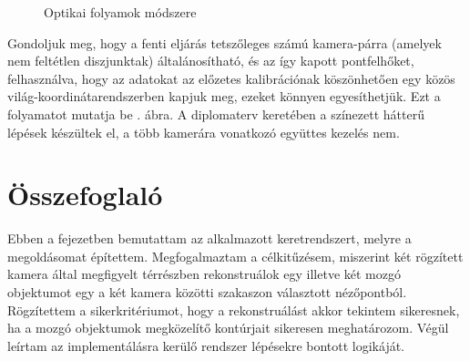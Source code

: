 \begin{sidewaysfigure}
{
}

\caption{Optikai folyamok módszere \label{fig:of-method}}
\end{sidewaysfigure}

Gondoljuk meg, hogy a fenti eljárás tetszőleges számú kamera-párra (amelyek nem feltétlen diszjunktak) általánosítható, és az így kapott pontfelhőket, felhasználva, hogy az adatokat az előzetes kalibrációnak köszönhetően egy közös világ-koordinátarendszerben kapjuk meg, ezeket könnyen egyesíthetjük. Ezt a folyamatot mutatja be . ábra. A diplomaterv keretében a színezett hátterű lépések készültek el, a több kamerára vonatkozó együttes kezelés nem.

\section{Összefoglaló}

Ebben a fejezetben bemutattam az alkalmazott keretrendszert, melyre a megoldásomat építettem. Megfogalmaztam a célkitűzésem, miszerint két rögzített kamera által megfigyelt térrészben rekonstruálok egy illetve két mozgó objektumot egy a két kamera közötti szakaszon választott nézőpontból. Rögzítettem a sikerkritériumot, hogy a rekonstruálást akkor tekintem sikeresnek, ha a mozgó objektumok megközelítő kontúrjait sikeresen meghatározom. Végül leírtam az implementálásra kerülő rendszer lépésekre bontott logikáját.
